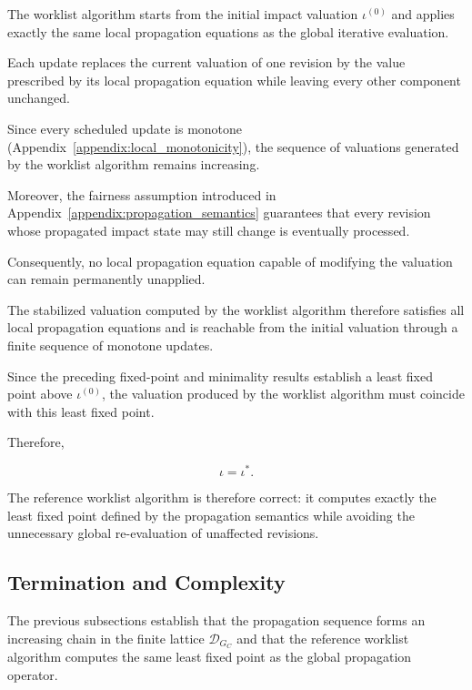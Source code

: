 \documentclass[10pt]{article}
\begin{document}
The worklist algorithm starts from the initial impact valuation
$\iota^{(0)}$ and applies exactly the same local propagation equations as the global iterative evaluation.

Each update replaces the current valuation of one revision by the value prescribed by its local propagation equation while leaving every other component unchanged.

Since every scheduled update is monotone
(Appendix~\ref{appendix:local_monotonicity}), the sequence of valuations generated by the worklist algorithm remains increasing.

Moreover, the fairness assumption introduced in
Appendix~\ref{appendix:propagation_semantics} guarantees that every revision whose propagated impact state may still change
is eventually processed.

Consequently, no local propagation equation capable of modifying the valuation can remain permanently unapplied.

The stabilized valuation computed by the worklist algorithm therefore satisfies all local propagation equations and is reachable from the initial valuation through a finite sequence of monotone updates.

Since the preceding fixed-point and minimality results establish a least fixed
point above $\iota^{(0)}$, the valuation produced by the worklist algorithm must
coincide with this least fixed point.

Therefore,

\begin{equation}
	\label{eq:worklist_correctness}
	\iota
	=
	\iota^{*}.
\end{equation}

The reference worklist algorithm is therefore correct: it computes exactly the least fixed point defined by the propagation semantics while avoiding the unnecessary global re-evaluation of unaffected revisions.

\subsection{Termination and Complexity}

The previous subsections establish that the propagation sequence forms an increasing chain in the finite lattice $\mathcal D_{G_C}$
and that the reference worklist algorithm computes the same least fixed point as the global propagation operator.
\end{document}

